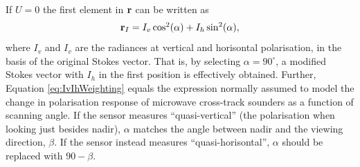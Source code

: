 If $U=0$ the first element in $\mathbf{r}$ can be written as
\begin{equation}
  $\VctStl{r}$_I = I_v\cos^2(\alpha) + I_h\sin^2(\alpha), 
  \label{eq:IvIhWeighting}
\end{equation}
where $I_v$ and $I_v$ are the radiances at vertical and horisontal
polarisation, in the basis of the original Stokes vector. That is, by selecting
$\alpha=90^\circ$, a modified Stokes vector with $I_h$ in the first position is
effectively obtained. Further, Equation \ref{eq:IvIhWeighting} equals the
expression normally assumed to model the change in polarisation response of
microwave cross-track sounders as a function of scanning angle. If the sensor
measures ``quasi-vertical'' (the polarisation when looking just besides nadir),
$\alpha$ matches the angle between nadir and the viewing direction, $\beta$. If
the sensor instead measures ``quasi-horisontal'', $\alpha$ should be replaced
with $90-\beta$.





